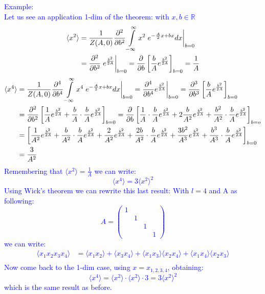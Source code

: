 \documentclass[12pt, english, a4paper]{book}
\newcommand{\parder}[2]{\frac{\partial^ #2}{\partial #1 ^ #2}}
\newcommand{\partiald}[1]{\frac{\partial}{\partial #1}}
\begin{document}
\textcolor{blue}
{Example: \\
Let us see an application 1-dim of the theorem: with $ x,b \in \mathbb{R} $
\begin{align*}
\langle x^2 \rangle
& = \frac{1}{Z(A, 0)} \frac{\partial^2}{\partial b^2} \int\limits_{-\infty}^{\infty} x^2 \hspace{1mm} e^{-\frac{A}{2} x + bx} dx \bigg \vert_{b=0} \\
& = \frac{\partial^2}{\partial b^2} \hspace{1mm} e^{ \frac{b^2}{2A} } \bigg \vert_{b=0} = \frac{\partial}{\partial b} \left[ \frac{b}{A} e^{ \frac{b^2}{2A} } \right]_{b=0} = \frac{1}{A}
\end{align*}
\begin{align*}
\langle x^4 \rangle & = \frac{1}{Z(A, 0)} \parder{b}{4} \int\limits_{-\infty}^{\infty} x^4 \hspace{1mm} e^{-\frac{A}{2} x + bx} dx \bigg \vert_{b=0} = \parder{b}{4} e^{\frac{b^2}{2A}} \bigg\vert_{b=0} = \parder{b}{3} \left[ \frac{b}{A} e^{ \frac{b^2}{2A} } \right]_{b=0} \\
& = \parder{b}{2} \left[ \frac{1}{A} e^{ \frac{b^2}{2A} } + \frac{b}{A} \cdot \frac{b}{A} e^{ \frac{b^2}{2A} } \right]_{b=0} = \partiald{b} \left[ \frac{1}{A} \cdot \frac{b}{A} e^{ \frac{b^2}{2A} } + 2 \frac{b}{A^2} e^{ \frac{b^2}{2A} } + \frac{b^2}{A^2} \cdot \frac{b}{A} e^{ \frac{b^2}{2A} } \right]_{b=o} \\
& = \left[ \frac{1}{A^2} e^{ \frac{b^2}{2A} } + \frac{b}{A^2} \cdot \frac{b}{A} e^{ \frac{b^2}{2A} } + \frac{2}{A^2} e^{ \frac{b^2}{2A} } + \frac{2b}{A^2} \cdot \frac{b}{A} e^{ \frac{b^2}{2A} } + \frac{3b^2}{A^3} e^{ \frac{b^2}{2A} } + \frac{b^3}{A^3} \cdot \frac{b}{A} e^{ \frac{b^2}{2A} } \right]_{b=0} \\
& = \frac{3}{A^2}
\end{align*}
Remembering that $ \langle x^2 \rangle = \frac{1}{A} $ we can write:
$$ \langle x^4 \rangle = 3 \langle x^2 \rangle^2 $$
Using Wick's theorem we can rewrite this last result:
With $l=4$ and A as following:
$$ A = \left(
\begin{matrix}
1 & & & \\
& 1 & & \\
& & 1 & \\
& & & 1
\end{matrix}
\right) $$
we can write:
\begin{align*}
\langle x_1 x_2 x_3 x_4 \rangle & = \langle x_1 x_2 \rangle + \langle x_3 x_4 \rangle + \langle x_1 x_3 \rangle \langle x_2 x_4 \rangle + \langle x_1 x_4 \rangle \langle x_2 x_3 \rangle \\
\end{align*}
Now come back to the 1-dim case, using $ x = x_{1,2,3,4} $, obtaining:
$$ \langle x^4 \rangle = \langle x^2 \rangle \cdot \langle x^2 \rangle \cdot 3 = 3 \langle x^2 \rangle^2 $$
which is the same result as before.}
\end{document}
